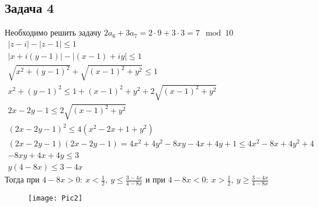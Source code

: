 \subsection*{Задача 4}
	Необходимо решить задачу $2a_6 + 3a_7 = 2 \cdot 9 + 3 \cdot 3 = 7 \mod 10$
	\begin{gather*}
		|z - i| - |z - 1| \leqslant 1\\
		|x + i(y - 1)| - |(x - 1) + iy| \leqslant 1\\
		\sqrt{x^2 + (y - 1)^2} + \sqrt{(x - 1)^2 + y^2} \leqslant 1\\
		x^2 + (y-1)^2 \leqslant 1 + (x-1)^2 + y^2 + 2\sqrt{(x-1)^2 + y^2}\\
		2x - 2y - 1 \leqslant 2\sqrt{(x-1)^2 + y^2}\\
		(2x - 2y - 1)^2 \leqslant 4(x^2 - 2x + 1 + y^2)\\
		(2x - 2y - 1)(2x - 2y - 1) = 4x^2 + 4y^2 - 8xy - 4x + 4y + 1 \leqslant 4x^2 - 8x + 4y^2 + 4\\
		-8xy + 4x + 4y \leqslant 3\\
		y(4 - 8x) \leqslant 3 - 4x
	\end{gather*}
	Тогда при $4 - 8x > 0:\ x < \frac{1}{2},\ y \leqslant \frac{3 - 4x}{4 - 8x}$ и при $4 - 8x < 0:\ x > \frac{1}{2},\ y \geqslant \frac{3 - 4x}{4 - 8x}$
	\begin{figure}[!h]
		\texttt{[image: Pic2]}
	\end{figure}
\vskip 0.4in

\begin{comment}
\subsection*{Задача 5}
	Необходимо решить задачу $3a_0 + 4a_8 = 3 \cdot 1 + 4 \cdot 8 = 5 \mod 10$
	
\vskip 0.4in
\end{comment}

